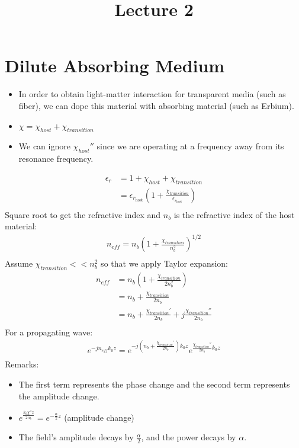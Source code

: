 \documentclass[11pt]{article}
\title{Lecture 2}
\author{}
\date{}
\begin{document}
\maketitle

\section{Dilute Absorbing Medium}
\begin{itemize}
    \item In order to obtain light-matter interaction for transparent media (such as fiber), we can dope this material with absorbing material (such as Erbium).
    \item $\chi = \chi_{host} + \chi_{transition}$
    \item We can ignore $\chi_{host}''$ since we are operating at a frequency away from its resonance frequency. 
\end{itemize}
\begin{align*}
    \epsilon_r &= 1 + \chi_{host} + \chi_{transition} \\
    &= \epsilon_{r_{\text{host}}} \left( 1 + \frac{\chi_{transition}}{\epsilon_{r_{\text{host}}}} \right) \\
\end{align*}
Square root to get the refractive index and $n_b$ is the refractive index of the host material:
\begin{align*}
    n_{eff} = n_b \left( 1 + \frac{\chi_{transition}}{n_b^2}\right)^{1/2} \\
\end{align*}
Assume $\chi_{transition} << n_b^2$ so that we apply Taylor expansion:
\begin{align*}
    n_{eff} &= n_b \left( 1 + \frac{\chi_{transition}}{2n_b^2}\right) \\
    &= n_b + \frac{\chi_{transition}}{2n_b} \\
    &= n_b + \frac{\chi_{transition}'}{2n_b} + j \frac{\chi_{transition}''}{2n_b} \\
\end{align*}
For a propagating wave:
\begin{align*}
    e^{-jn_{eff}k_0z} = e^{-j \left(n_b + \frac{\chi_{transition}'}{2n_b} \right)k_0z} e^{\frac{\chi_{transition}''}{2n_b}k_0z} \\
\end{align*}
Remarks:
\begin{itemize}
    \item The first term represents the phase change and the second term represents the amplitude change.
    \item $e^{\frac{k_0 \chi''z}{2n_b}} = e^{-\frac{\alpha}{2}z}$ (amplitude change)
    \item The field's amplitude decays by $\frac{\alpha}{2}$, and the power decays by $\alpha$.
\end{itemize}
\end{document}
